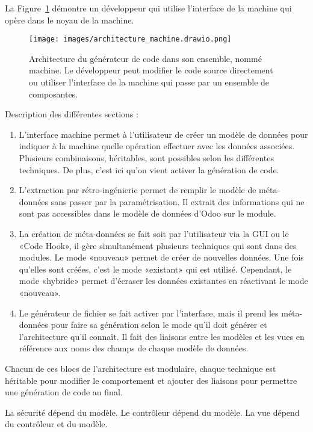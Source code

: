 La Figure~\ref{fig:dia_architecture} démontre un développeur qui utilise l'interface de la machine qui opère dans le noyau de la machine.

\begin{figure}
\centering
\texttt{[image: images/architecture\_machine.drawio.png]}
\caption{Architecture du générateur de code dans son ensemble, nommé machine. Le développeur peut modifier le code source directement ou utiliser l'interface de la machine qui passe par un ensemble de composantes.}
\label{fig:dia_architecture}
\end{figure}

Description des différentes sections : 
\begin{enumerate}
    \item L’interface machine permet à l’utilisateur de créer un modèle de données pour indiquer à la machine quelle opération effectuer avec les données associées. Plusieurs combinaisons, héritables, sont possibles selon les différentes techniques. De plus, c’est ici qu’on vient activer la génération de code.
    \item L’extraction par rétro-ingénierie permet de remplir le modèle de méta-données sans passer par la paramétrisation. Il extrait des informations qui ne sont pas accessibles dans le modèle de données d’Odoo sur le module.
    \item La création de méta-données se fait soit par l’utilisateur via la GUI ou le «Code Hook», il gère simultanément plusieurs techniques qui sont dans des modules. Le mode «nouveau» permet de créer de nouvelles données. Une fois qu’elles sont créées, c’est le mode «existant» qui est utilisé. Cependant, le mode «hybride» permet d’écraser les données existantes en réactivant le mode «nouveau».
    \item Le générateur de fichier se fait activer par l’interface, mais il prend les méta-données pour faire sa génération selon le mode qu’il doit générer et l’architecture qu’il connaît. Il fait des liaisons entre les modèles et les vues en référence aux noms des champs de chaque modèle de données.
\end{enumerate}

Chacun de ces blocs de l’architecture est modulaire, chaque technique est héritable pour modifier le comportement et ajouter des liaisons pour permettre une génération de code au final.

La sécurité dépend du modèle. Le contrôleur dépend du modèle. La vue dépend du contrôleur et du modèle.

